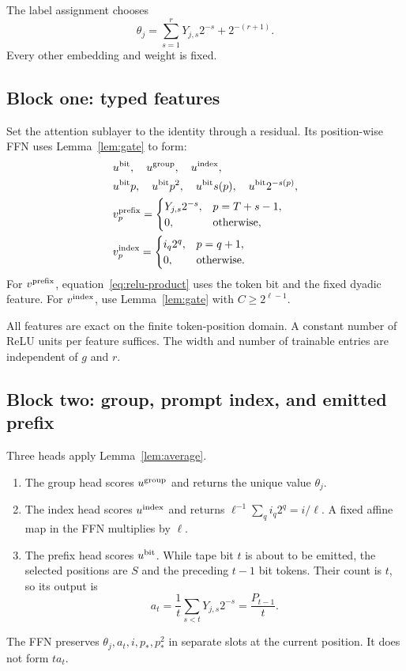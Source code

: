 The label assignment chooses
\[
 \theta_j=\sum_{s=1}^rY_{j,s}2^{-s}+2^{-(r+1)}.
 \tag{C.4}
\]
Every other embedding and weight is fixed.

\subsection{Block one: typed features}\label{app:block1}

Set the attention sublayer to the identity through a residual. Its position-wise FFN uses
Lemma~\ref{lem:gate} to form:
\begin{align*}
 &u^{\rm bit},\quad u^{\rm group},\quad u^{\rm index},\\
 &u^{\rm bit}p,\quad u^{\rm bit}p^2,\quad
 u^{\rm bit}s(p),\quad u^{\rm bit}2^{-s(p)},\\
 &v^{\rm prefix}_p
 =\begin{cases}Y_{j,s}2^{-s},&p=T+s-1,\\0,&\text{otherwise},\end{cases}\\
 &v^{\rm index}_p
 =\begin{cases}i_q2^q,&p=q+1,\\0,&\text{otherwise}.
 \end{cases}
\end{align*}
For $v^{\rm prefix}$, equation~\eqref{eq:relu-product} uses the token bit and the fixed dyadic
feature. For $v^{\rm index}$, use Lemma~\ref{lem:gate} with $C\geq2^{\ell-1}$.

All features are exact on the finite token-position domain. A constant number of ReLU units per
feature suffices. The width and number of trainable entries are independent of $g$ and $r$.

\subsection{Block two: group, prompt index, and emitted prefix}\label{app:block2}

Three heads apply Lemma~\ref{lem:average}.
\begin{enumerate}[leftmargin=*]
 \item The group head scores $u^{\rm group}$ and returns the unique value $\theta_j$.
 \item The index head scores $u^{\rm index}$ and returns
 $\ell^{-1}\sum_qi_q2^q=i/\ell$. A fixed affine map in the FFN multiplies by $\ell$.
 \item The prefix head scores $u^{\rm bit}$. While tape bit $t$ is about to be emitted, the
 selected positions are $S$ and the preceding $t-1$ bit tokens. Their count is $t$, so its output is
 \[
 a_t=\frac1t\sum_{s<t}Y_{j,s}2^{-s}=\frac{P_{t-1}}t.
 \tag{C.5}
 \]
\end{enumerate}
The FFN preserves $\theta_j,a_t,i,p_*,p_*^2$ in separate slots at the current position. It does not
form $t a_t$.

